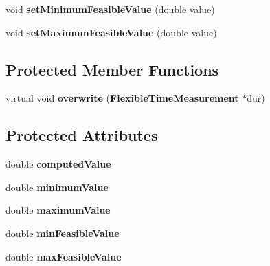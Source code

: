 \begin{CompactItemize}
\item 
void \textbf{setMinimumFeasibleValue} (double value)\label{classbr_1_1pucrio_1_1telemidia_1_1ginga_1_1ncl_1_1model_1_1time_1_1FlexibleTimeMeasurement_b0b015ab3d11d4c7ef7b95452b878773}

\item 
void \textbf{setMaximumFeasibleValue} (double value)\label{classbr_1_1pucrio_1_1telemidia_1_1ginga_1_1ncl_1_1model_1_1time_1_1FlexibleTimeMeasurement_1f41764e571bc0aa7bf66fe05e5ba51d}

\end{CompactItemize}
\subsection*{Protected Member Functions}
\begin{CompactItemize}
\item 
virtual void \textbf{overwrite} ({\bf FlexibleTimeMeasurement} $\ast$dur)\label{classbr_1_1pucrio_1_1telemidia_1_1ginga_1_1ncl_1_1model_1_1time_1_1FlexibleTimeMeasurement_7515ab19c6622c8ff575df282787d554}

\end{CompactItemize}
\subsection*{Protected Attributes}
\begin{CompactItemize}
\item 
double {\bf computedValue}\label{classbr_1_1pucrio_1_1telemidia_1_1ginga_1_1ncl_1_1model_1_1time_1_1FlexibleTimeMeasurement_3540439c7a8f9286198893791488b86e}

\item 
double {\bf minimumValue}\label{classbr_1_1pucrio_1_1telemidia_1_1ginga_1_1ncl_1_1model_1_1time_1_1FlexibleTimeMeasurement_cc9bf30189a702c7504cc9b9bf54928e}

\item 
double {\bf maximumValue}\label{classbr_1_1pucrio_1_1telemidia_1_1ginga_1_1ncl_1_1model_1_1time_1_1FlexibleTimeMeasurement_e8d44c9061be5a87efc58e3f6d427513}

\item 
double {\bf minFeasibleValue}\label{classbr_1_1pucrio_1_1telemidia_1_1ginga_1_1ncl_1_1model_1_1time_1_1FlexibleTimeMeasurement_464ffb3747c2940b6e87e5423d9fbe4c}

\item 
double {\bf maxFeasibleValue}\label{classbr_1_1pucrio_1_1telemidia_1_1ginga_1_1ncl_1_1model_1_1time_1_1FlexibleTimeMeasurement_33a370ddd356ff778521f993e4877c0e}

\end{CompactItemize}
